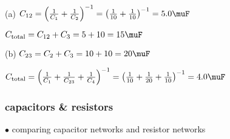 
\begin{compactitem}
	\item[(a)] $C_{12} = \left( \frac{1}{C_1} + \frac{1}{C_2} \right)^{-1} = \left( \frac{1}{10} + \frac{1}{10} \right)^{-1} = 5.0 \muF$
	
	$C_\text{total} = C_{12} + C_3 = 5 + 10 = 15 \muF$
	
	\item[(b)] $C_{23} = C_2 + C_3 = 10 + 10 = 20 \muF$
	
	$C_\text{total} = \left( \frac{1}{C_1} + \frac{1}{C_{23}} + \frac{1}{C_4} \right)^{-1} = \left( \frac{1}{10} + \frac{1}{20} + \frac{1}{10} \right)^{-1} = 4.0 \muF$ \eoe
\end{compactitem}

\subsubsection{capacitors \& resistors}

$\bullet$ comparing capacitor networks and resistor networks

